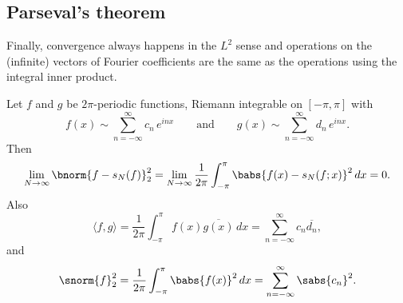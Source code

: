 \subsection{Parseval's theorem}

Finally,
convergence always happens in the $L^2$ sense and
operations on the (infinite) vectors of
Fourier coefficients are the same as the operations using the integral
inner product.

\begin{samepage}
\begin{thm} 
Let $f$ and $g$ be $2\pi$-periodic functions, Riemann integrable 
on $[-\pi,\pi]$
with
\begin{equation*}
f(x) \sim
\sum_{n=-\infty}^\infty c_n \,e^{inx}
\qquad \text{and} \qquad
g(x) \sim
\sum_{n=-\infty}^\infty d_n \,e^{inx} .
\end{equation*}
Then
\begin{equation*}
\lim_{N\to\infty} \bnorm{f-s_N(f)}_2^2 = 
\lim_{N\to\infty}
\frac{1}{2\pi}
\int_{-\pi}^\pi
\babs{f(x)-s_N(f;x)}^2 \, dx
=0 .
\end{equation*}
Also
\begin{equation*}
\langle f , g \rangle =
\frac{1}{2\pi}
\int_{-\pi}^\pi
f(x) \overline{g(x)}\, dx
=
\sum_{n=-\infty}^\infty c_n \overline{d_n} ,
\end{equation*}
and
\begin{equation*}
\snorm{f}_2^2
=
\frac{1}{2\pi}
\int_{-\pi}^\pi
\babs{f(x)}^2 \, dx
=
\sum_{n=-\infty}^\infty \sabs{c_n}^2.
\end{equation*}
\end{thm}
\end{samepage}

